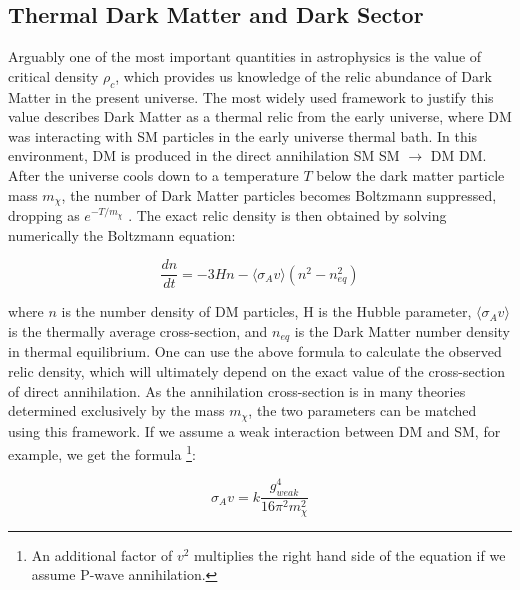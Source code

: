 \subsection{Thermal Dark Matter and Dark Sector}
\label{ch1:sec:thermal-dm}

Arguably one of the most important quantities in astrophysics is the value of critical density $\rho_c$, which provides us knowledge of the relic abundance of Dark Matter in the present universe. The most widely used framework to justify this value describes Dark Matter as a thermal relic from the early universe, where DM was interacting with SM particles in the early universe thermal bath. In this environment, DM is produced in the direct annihilation SM SM $\to$ DM DM. After the universe cools down to a temperature $T$ below the dark matter particle mass $m_{\chi}$, the number of Dark Matter particles becomes Boltzmann suppressed, dropping as $e^{- T / m_{\chi}}$ \cite{Feng:2010gw}.  The exact relic density is then obtained by solving numerically the Boltzmann equation:

  \begin{equation}
    \label{eq:boltzman-equation}
    \frac{d n}{d t} = -3 H n - \langle \sigma_A v \rangle (n^2 - n^2_{eq})
  \end{equation}

  where $n$ is the number density of DM particles, H is the Hubble parameter,  $\langle \sigma_A v \rangle$ is the thermally average cross-section, and $n_{eq}$ is the Dark Matter number density in thermal equilibrium. One can use the above formula to calculate the observed relic density, which will ultimately depend on the exact value of the cross-section of direct annihilation. As the annihilation cross-section is in many theories determined exclusively by the mass $m_{\chi}$, the two parameters can be matched using this framework. If we assume a weak interaction between DM and SM, for example, we get the formula \cite{Feng:2010gw}\footnote{An additional factor of $v^2$ multiplies the right hand side of the equation if we assume P-wave annihilation.}:

  \begin{equation}
    \label{eq:dm-fo-sigma}
    \sigma_A v = k \frac{g^4_{weak}}{16 \pi^2 m^2_{\chi}}
  \end{equation}


